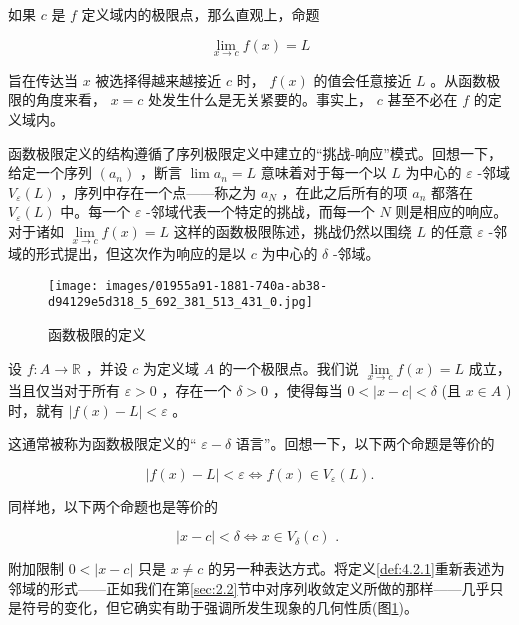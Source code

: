 如果 \(c\) 是 \(f\) 定义域内的极限点，那么直观上，命题

\[
\mathop{\lim }\limits_{{x \rightarrow  c}}f\left( x\right)  = L
\]

旨在传达当 \(x\) 被选择得越来越接近 \(c\) 时， \(f\left( x\right)\) 的值会任意接近 \(L\) 。从函数极限的角度来看， \(x = c\) 处发生什么是无关紧要的。事实上， \(c\) 甚至不必在 \(f\) 的定义域内。

函数极限定义的结构遵循了序列极限定义中建立的“挑战-响应”模式。回想一下，给定一个序列 \(\left( {a}_{n}\right)\) ，断言 \(\lim {a}_{n} = L\) 意味着对于每一个以 \(L\) 为中心的 \(\varepsilon\) -邻域 \({V}_{\varepsilon }\left( L\right)\) ，序列中存在一个点——称之为 \({a}_{N} \) ，在此之后所有的项 \({a}_{n}\) 都落在 \({V}_{\varepsilon }\left( L\right)\) 中。每一个 \(\varepsilon\) -邻域代表一个特定的挑战，而每一个 \(N\) 则是相应的响应。对于诸如 \(\mathop{\lim }\limits_{{x \rightarrow  c}}f\left( x\right)  = L\) 这样的函数极限陈述，挑战仍然以围绕 \(L\) 的任意 \(\varepsilon\) -邻域的形式提出，但这次作为响应的是以 \(c\) 为中心的 \(\delta\) -邻域。


\begin{figure}[h]
  \centering
  \texttt{[image: images/01955a91-1881-740a-ab38-d94129e5d318\_5\_692\_381\_513\_431\_0.jpg]}
  \caption{函数极限的定义}
  \label{fig:4.4}
\end{figure}



\begin{Def}
  \label{def:4.2.1}
  设 \(f : A \rightarrow  \mathbb{R}\) ，并设 \(c\) 为定义域 \(A\) 的一个极限点。我们说 \(\mathop{\lim }\limits_{{x \rightarrow  c}}f\left( x\right)  = L\) 成立，当且仅当对于所有 \(\varepsilon  > 0\) ，存在一个 \(\delta  > 0\) ，使得每当 \(0 < \left| {x - c}\right|  < \delta\) (且 \(x \in  A\) )时，就有 \(\left| {f\left( x\right)  - L}\right|  < \varepsilon\) 。

\end{Def}

这通常被称为函数极限定义的“ \(\varepsilon  - \delta\) 语言”。回想一下，以下两个命题是等价的

\[
\left| {f\left( x\right)  - L}\right|  < \varepsilon  \Leftrightarrow f\left( x\right)  \in  {V}_{\varepsilon }\left( L\right) .
\]

同样地，以下两个命题也是等价的

\[
\left| {x - c}\right|  < \delta  \Leftrightarrow x \in  {V}_{\delta }\left( c\right) \text{ . }
\]

附加限制 \(0 < \left| {x - c}\right|\) 只是 \(x \neq  c\) 的另一种表达方式。将定义\ref{def:4.2.1}重新表述为邻域的形式——正如我们在第\ref{sec:2.2}节中对序列收敛定义所做的那样——几乎只是符号的变化，但它确实有助于强调所发生现象的几何性质(图\ref{fig:4.4})。

